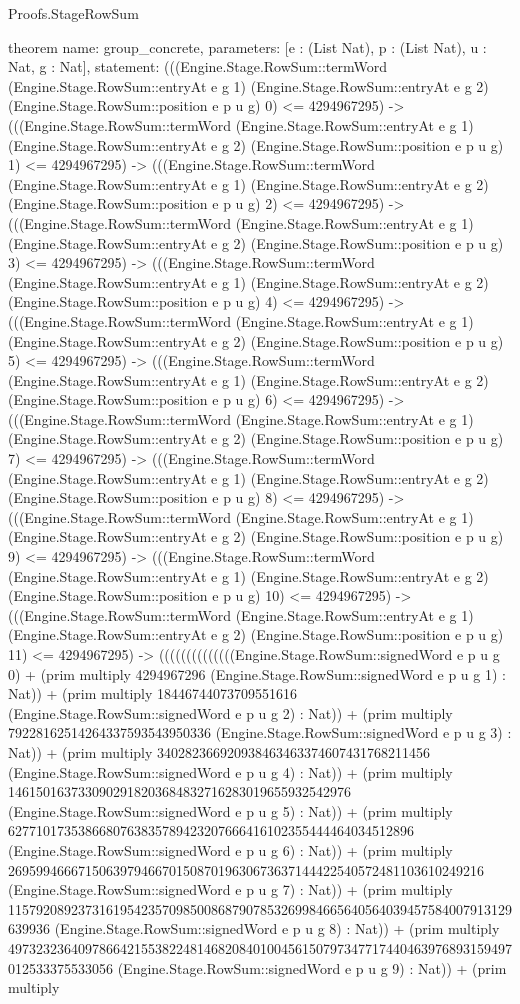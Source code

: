 \begin{lexlean}{Proofs.StageRowSum}
\begin{semanticmodule}
theorem{
  name: group_concrete,
  parameters: [e : (List Nat), p : (List Nat), u : Nat, g : Nat],
  statement: (((Engine.Stage.RowSum::termWord (Engine.Stage.RowSum::entryAt e g 1) (Engine.Stage.RowSum::entryAt e g 2) (Engine.Stage.RowSum::position e p u g) 0) <= 4294967295) -> (((Engine.Stage.RowSum::termWord (Engine.Stage.RowSum::entryAt e g 1) (Engine.Stage.RowSum::entryAt e g 2) (Engine.Stage.RowSum::position e p u g) 1) <= 4294967295) -> (((Engine.Stage.RowSum::termWord (Engine.Stage.RowSum::entryAt e g 1) (Engine.Stage.RowSum::entryAt e g 2) (Engine.Stage.RowSum::position e p u g) 2) <= 4294967295) -> (((Engine.Stage.RowSum::termWord (Engine.Stage.RowSum::entryAt e g 1) (Engine.Stage.RowSum::entryAt e g 2) (Engine.Stage.RowSum::position e p u g) 3) <= 4294967295) -> (((Engine.Stage.RowSum::termWord (Engine.Stage.RowSum::entryAt e g 1) (Engine.Stage.RowSum::entryAt e g 2) (Engine.Stage.RowSum::position e p u g) 4) <= 4294967295) -> (((Engine.Stage.RowSum::termWord (Engine.Stage.RowSum::entryAt e g 1) (Engine.Stage.RowSum::entryAt e g 2) (Engine.Stage.RowSum::position e p u g) 5) <= 4294967295) -> (((Engine.Stage.RowSum::termWord (Engine.Stage.RowSum::entryAt e g 1) (Engine.Stage.RowSum::entryAt e g 2) (Engine.Stage.RowSum::position e p u g) 6) <= 4294967295) -> (((Engine.Stage.RowSum::termWord (Engine.Stage.RowSum::entryAt e g 1) (Engine.Stage.RowSum::entryAt e g 2) (Engine.Stage.RowSum::position e p u g) 7) <= 4294967295) -> (((Engine.Stage.RowSum::termWord (Engine.Stage.RowSum::entryAt e g 1) (Engine.Stage.RowSum::entryAt e g 2) (Engine.Stage.RowSum::position e p u g) 8) <= 4294967295) -> (((Engine.Stage.RowSum::termWord (Engine.Stage.RowSum::entryAt e g 1) (Engine.Stage.RowSum::entryAt e g 2) (Engine.Stage.RowSum::position e p u g) 9) <= 4294967295) -> (((Engine.Stage.RowSum::termWord (Engine.Stage.RowSum::entryAt e g 1) (Engine.Stage.RowSum::entryAt e g 2) (Engine.Stage.RowSum::position e p u g) 10) <= 4294967295) -> (((Engine.Stage.RowSum::termWord (Engine.Stage.RowSum::entryAt e g 1) (Engine.Stage.RowSum::entryAt e g 2) (Engine.Stage.RowSum::position e p u g) 11) <= 4294967295) -> ((((((((((((((Engine.Stage.RowSum::signedWord e p u g 0) + (prim multiply 4294967296 (Engine.Stage.RowSum::signedWord e p u g 1) : Nat)) + (prim multiply 18446744073709551616 (Engine.Stage.RowSum::signedWord e p u g 2) : Nat)) + (prim multiply 79228162514264337593543950336 (Engine.Stage.RowSum::signedWord e p u g 3) : Nat)) + (prim multiply 340282366920938463463374607431768211456 (Engine.Stage.RowSum::signedWord e p u g 4) : Nat)) + (prim multiply 1461501637330902918203684832716283019655932542976 (Engine.Stage.RowSum::signedWord e p u g 5) : Nat)) + (prim multiply 6277101735386680763835789423207666416102355444464034512896 (Engine.Stage.RowSum::signedWord e p u g 6) : Nat)) + (prim multiply 26959946667150639794667015087019630673637144422540572481103610249216 (Engine.Stage.RowSum::signedWord e p u g 7) : Nat)) + (prim multiply 115792089237316195423570985008687907853269984665640564039457584007913129639936 (Engine.Stage.RowSum::signedWord e p u g 8) : Nat)) + (prim multiply 497323236409786642155382248146820840100456150797347717440463976893159497012533375533056 (Engine.Stage.RowSum::signedWord e p u g 9) : Nat)) + (prim multiply }
\end{semanticmodule}
\end{lexlean}
